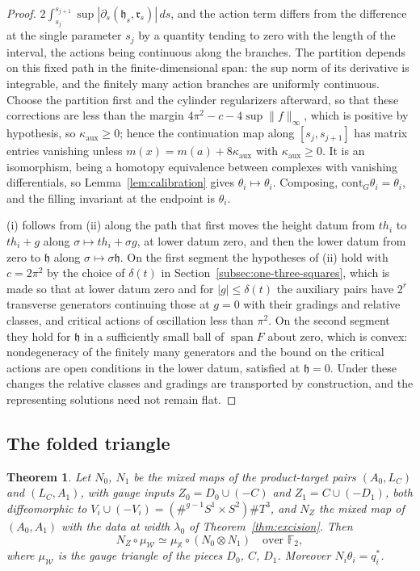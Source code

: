 \documentclass[11pt]{amsart}
\newtheorem{theorem}{Theorem}[section]
\theoremstyle{definition}
\theoremstyle{remark}
\theoremstyle{plain}
\numberwithin{equation}{section}
\newcommand{\FF}{\mathbb{F}_2}
\begin{document}
\begin{proof}
$2\int_{s_j}^{s_{j+1}}\sup|\partial_s(\mathfrak h_s,\mathfrak r_s)|\,ds$, and the action term
differs from the difference at the single parameter $s_j$ by a quantity tending to zero with the
length of the interval, the actions being continuous along the branches.
The partition depends on this fixed path in the finite-dimensional span:
the sup norm of its derivative is integrable, and the finitely many action
branches are uniformly continuous. Choose the partition first and the
cylinder regularizers afterward, so that these corrections are less than
the margin $4\pi^2-c-4\sup\|f\|_\infty$, which is
positive by hypothesis, so $\kappa_{\mathrm{aux}}\ge0$; hence the continuation map along
$[s_j,s_{j+1}]$ has matrix entries vanishing unless $m(x)=m(a)+8\kappa_{\mathrm{aux}}$ with
$\kappa_{\mathrm{aux}}\ge0$. It is an isomorphism, being a homotopy equivalence between
complexes with vanishing differentials, so Lemma~\ref{lem:calibration} gives
$\theta_i\mapsto\theta_i$. Composing, $\mathrm{cont}_G\theta_i=\theta_i$, and the filling
invariant at the endpoint is $\theta_i$.

(i) follows from (ii) along the path that first moves the height datum from $th_i$ to $th_i+g$
along $\sigma\mapsto th_i+\sigma g$, at lower datum zero, and then the lower datum from zero to
$\mathfrak h$ along $\sigma\mapsto\sigma\mathfrak h$. On the first segment the hypotheses of
(ii) hold with $c=2\pi^2$ by the choice of $\delta(t)$ in
Section~\ref{subsec:one-three-squares}, which is made so that at lower datum zero and for
$|g|\le\delta(t)$ the auxiliary pairs have $2^r$ transverse generators continuing those at $g=0$
with their gradings and relative classes, and critical actions of oscillation less than
$\pi^2$. On the second segment they
hold for $\mathfrak h$ in a sufficiently small ball of $\operatorname{span}F$ about zero, which
is convex: nondegeneracy of the finitely many generators and the bound on the critical actions
are open conditions in the lower datum, satisfied at $\mathfrak h=0$. Under these changes the
relative classes and gradings are transported by construction, and the representing solutions
need not remain flat.
\end{proof}

\subsection{The folded triangle}

\begin{theorem}\label{thm:folded-triangle}
Let $N_0$, $N_1$ be the mixed maps of the product-target pairs
$(A_0,L_C)$ and $(L_C,A_1)$,
with gauge inputs $Z_0=D_0\cup(-C)$ and $Z_1=C\cup(-D_1)$, both diffeomorphic to
$V_i\cup(-V_i)=(\#^{g-1}S^1\times S^2)\#T^3$, and $N_Z$ the mixed map of
$(A_0,A_1)$ with the data at width $\lambda_0$ of Theorem~\ref{thm:excision}. Then
\[
N_Z\circ\mu_{\mathscr W}\simeq\mu_{\mathbb X}\circ(N_0\otimes N_1)\quad\text{over }\FF,
\]
where $\mu_{\mathscr W}$ is the gauge triangle of the pieces $D_0$, $C$, $D_1$.
Moreover $N_i\theta_i=q_i^*$.
\end{theorem}
\end{document}
